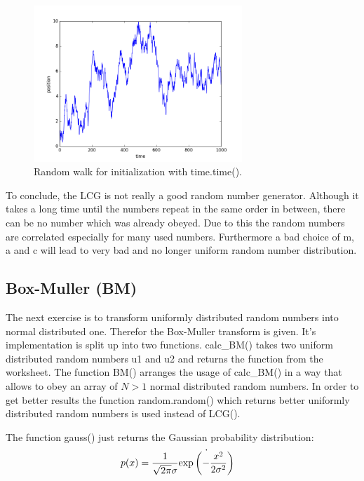 \begin{figure}[ht]
	\centering
	\includegraphics[width=0.7\textwidth]{../dat/random_walk.png}
	\caption{
		Random walk for initialization with time.time().
		}
	\label{randwalk}
\end{figure}

To conclude, the LCG is not really a good random number generator.
Although it takes a long time until the numbers repeat in the same order in between, there can be no number which was already obeyed.
Due to this the random numbers are correlated especially for many used numbers.
Furthermore a bad choice of m, a and c will lead to very bad and no longer uniform random number distribution.

\FloatBarrier

\subsection{Box-Muller (BM)}

The next exercise is to transform uniformly distributed random numbers into 
normal distributed one. 
Therefor the Box-Muller transform is given.
It's implementation is split up into two functions.
calc\_BM() takes two uniform distributed random numbers u1 and u2 and returns the function from the worksheet. 
The function BM() arranges the usage of calc\_BM() in a way that allows to obey an array of $N>1$ normal distributed random numbers. 
In order to get better results the function random.random() which returns better uniformly distributed random numbers is used instead of LCG().


The function gauss() just returns the Gaussian probability distribution:
\begin{align}
p(x) 
	&= \frac{1}{\sqrt{2\pi}\sigma}\dot{\text{exp}\left( -\frac{x^2}{2\sigma^2} \right)}
	\label{gauss}
\end{align}


